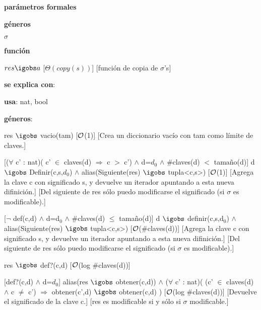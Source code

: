\begin{Interfaz}
	
	\textbf{parámetros formales}\parindent\\
	\parbox{1.7cm}{\textbf{géneros}} $\sigma$\\
	\parbox[t]{1.7cm}{\textbf{función}}\parbox[t]{\textwidth-2\parindent-1.7cm}{%
	    	{$res \igobs a$}
		[$\Theta(copy(s))$]
		[función de copia de $\sigma$'s]
	}
	
	\textbf{se explica con}: 
	
	\textbf{usa}: nat, bool
	
	\textbf{géneros}: 
	
	
	{res $\igobs$ vacio(tam)}
	[$\mathcal{O}$(1)]
	[Crea un diccionario vacío con tam como límite de claves.]
	
	[($\forall$ c' : nat)( c' $\in$ claves(d) $\Rightarrow$ c $>$ c') $\land$ d=$d_0$ $\land$ $\#$claves(d) $<$ tamaño(d)]
	{d $\igobs$ Definir(c,s,$d_0$) $\land$ alias(Siguiente(res) $\igobs$ tupla<c,s>)}
	[$\mathcal{O}$(1)]
	[Agrega la clave c con significado s, y devuelve un iterador apuntando a esta nueva difinición.]
	[Del siguiente de res sólo puedo modificarse el significado (si $\sigma$ es modificable).]
	
	[$\neg$ def(c,d) $\land$ d=d$_0$ $\land$ $\#$claves(d) $\leq$ tamaño(d)]
	{d $\igobs$ definir(c,s,d$_0$) $\land$ alias(Siguiente(res) $\igobs$ tupla<c,s>)}
	[$\mathcal{O}$($\#$claves(d))]
	[Agrega la clave c con significado s, y devuelve un iterador apuntando a esta nueva difinición.]
	[Del siguiente de res sólo puedo modificarse el significado (si $\sigma$ es modificable).]
	
	{res $\igobs$ def?(c,d)}
	[$\mathcal{O}$(log $\#$claves(d))]
	
	[def?(c,d) $\land$ d=$d_0$]
	{alias(res $\igobs$ obtener(c,d)) $\land$ ($\forall$ c' : nat)( (c' $\in$ claves(d) $\land$ c $\neq$ c') 
	$\Rightarrow$ obtener(c',d) $\igobs$ obtener(c,d) )}
	[$\mathcal{O}$(log $\#$claves(d))]
	[Devuelve el significado de la clave c.]
	[res es modificable si y sólo si $\sigma$ modificable.]
	
\end{Interfaz}

